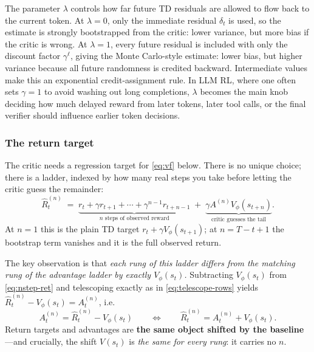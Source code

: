 The parameter $\lambda$ controls how far future TD residuals are allowed to
flow back to the current token. At $\lambda=0$, only the immediate residual
$\delta_t$ is used, so the estimate is strongly bootstrapped from the critic:
lower variance, but more bias if the critic is wrong. At $\lambda=1$, every
future residual is included with only the discount factor $\gamma^\ell$, giving
the Monte Carlo-style estimate: lower bias, but higher variance because all
future randomness is credited backward. Intermediate values make this an
exponential credit-assignment rule. In LLM RL, where one often sets
$\gamma=1$ to avoid washing out long completions, $\lambda$ becomes the main
knob deciding how much delayed reward from later tokens, later tool calls, or
the final verifier should influence earlier token decisions.


\subsubsection{The return target}
  
The critic needs a regression target for \eqref{eq:vf} below. There is no unique
choice; there is a ladder, indexed by how many real steps you take before letting
the critic guess the remainder:
%
\begin{equation}
  \hat{R}^{(n)}_t \;=\; \underbrace{r_t + \gamma r_{t+1} + \cdots + \gamma^{n-1}r_{t+n-1}}_{n \text{ steps of observed reward}}
  \;+\; \underbrace{\gamma A^{(n)} V_\phi(s_{t+n})}_{\text{critic guesses the tail}}.
  \label{eq:nstep-ret}
\end{equation}
%
At $n=1$ this is the plain TD target $r_t + \gamma V_{\phi}(s_{t+1})$; at
$n = T-t+1$ the bootstrap term vanishes and it is the full observed return.
   
The key observation is that \emph{each rung of this ladder differs from the
matching rung of the advantage ladder by exactly $V_{\phi}(s_t)$.} Subtracting $V_{\phi}(s_t)$
from \eqref{eq:nstep-ret} and telescoping exactly as in
\eqref{eq:telescope-rows} yields $\hat{R}^{(n)}_t - V_{\phi}(s_t) = A^{(n)}_t$, i.e.
%
\begin{equation}
  A^{(n)}_t = \hat{R}^{(n)}_t - V_{\phi}(s_t)
  \qquad\Longleftrightarrow\qquad
  \hat{R}^{(n)}_t = A^{(n)}_t + V_{\phi}(s_t).
\end{equation}
%
Return targets and advantages are \textbf{the same object shifted by the
baseline} ---and crucially, the shift $V(s_{t})$ is \emph{the same for every rung}:
it carries no $n$.
 
